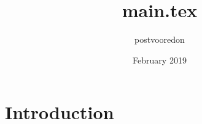 \documentclass{article}
\title{main.tex}
\author{postvooredon }
\date{February 2019}
\begin{document}
\maketitle
\section{Introduction}
\end{document}
